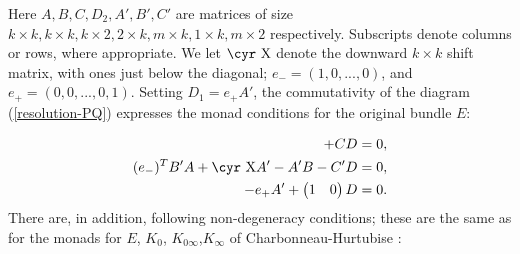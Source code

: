 \documentclass[12pt]{article}
\theoremstyle{definition}
\theoremstyle{remark}
\numberwithin{theorem}{section}
\newcommand{\Sh}{\hbox{\cyr X}}
\begin{document}
  
Here $A,B,C,D_2,A',B',C'$ are matrices of size $k\times k,k\times k, k\times 2,2\times k, m\times k,1\times k, m\times 2$ respectively. Subscripts denote columns or rows, where appropriate.
We let   $\Sh$ denote the downward $k \times k$ shift matrix, with ones just below the diagonal;  $e_-=(1,0,...,0)$, and  $e_+=(0,0,...,0,1)$. Setting $D_1 = e_+A'$, the commutativity of the diagram (\ref{resolution-PQ}) expresses the monad conditions for the original bundle $E$:

\begin{align}
  [A,B] + CD&=0,                     \nonumber                      \\
  \label{monad-cal}
  (e_-)^TB'A + \Sh A' - A'B -C'D&=0,   \\
   -e_+ A'+   \begin{pmatrix}1&0\end{pmatrix}   D &=0.   \nonumber                                  
  \end{align}
There are, in addition, following non-degeneracy conditions; these are the same as for the monads for $E$, $K_0$, $K_{0\infty}$,$K_\infty$ of Charbonneau-Hurtubise \cite[Theorem 5]{Charbonneau:2006gu}:
 
\end{document}
